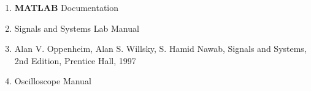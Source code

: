 \begin{enumerate}
    \item {\bf MATLAB} Documentation
    \item Signals and Systems Lab Manual
    \item Alan V. Oppenheim, Alan S. Willsky, S. Hamid Nawab, Signals and Systems, 2nd Edition, Prentice Hall, 1997
    \item Oscilloscope Manual
\end{enumerate}